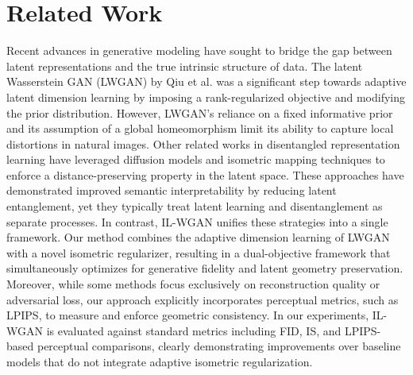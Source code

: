 \documentclass{article} %
\begin{document}
\section{Related Work}
\label{sec:related}
Recent advances in generative modeling have sought to bridge the gap between latent representations and the true intrinsic structure of data. The latent Wasserstein GAN (LWGAN) by Qiu et al. was a significant step towards adaptive latent dimension learning by imposing a rank-regularized objective and modifying the prior distribution. However, LWGAN’s reliance on a fixed informative prior and its assumption of a global homeomorphism limit its ability to capture local distortions in natural images. Other related works in disentangled representation learning have leveraged diffusion models\cite{CITATION_5} and isometric mapping techniques\cite{CITATION_6} to enforce a distance-preserving property in the latent space. These approaches have demonstrated improved semantic interpretability by reducing latent entanglement, yet they typically treat latent learning and disentanglement as separate processes. In contrast, IL-WGAN unifies these strategies into a single framework. Our method combines the adaptive dimension learning of LWGAN with a novel isometric regularizer, resulting in a dual-objective framework that simultaneously optimizes for generative fidelity and latent geometry preservation. Moreover, while some methods focus exclusively on reconstruction quality or adversarial loss, our approach explicitly incorporates perceptual metrics, such as LPIPS, to measure and enforce geometric consistency. In our experiments, IL-WGAN is evaluated against standard metrics including FID, IS, and LPIPS-based perceptual comparisons, clearly demonstrating improvements over baseline models that do not integrate adaptive isometric regularization.
\end{document}
